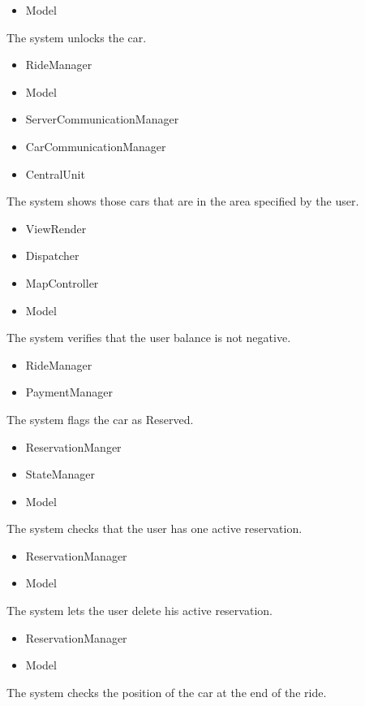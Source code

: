 \documentclass[11pt,a4paper]{report}
\begin{document}
\begin{Req}
\begin{itemize}
				\item Model
			\end{itemize}
		\item The system unlocks the car.
			\begin{itemize}
				\item RideManager
				\item Model
				\item ServerCommunicationManager
				\item CarCommunicationManager
				\item CentralUnit
			\end{itemize}
		\item The system shows those cars that are in the area specified by the user.
			\begin{itemize}
				\item ViewRender
				\item Dispatcher
				\item MapController
				\item Model
			\end{itemize}
		\item The system verifies that the user balance is not negative.
			\begin{itemize}
				\item RideManager
				\item PaymentManager
			\end{itemize}
		\item The system flags the car as Reserved.
			\begin{itemize}
				\item ReservationManger
				\item StateManager
				\item Model
			\end{itemize}
		\item The system checks that the user has one active reservation.
			\begin{itemize}
				\item ReservationManager
				\item Model
			\end{itemize}
		\item The system lets the user delete his active reservation.
			\begin{itemize}
				\item ReservationManager
				\item Model
			\end{itemize}
		\item The system checks the position of the car at the end of the ride.

\end{Req}
\end{document}
